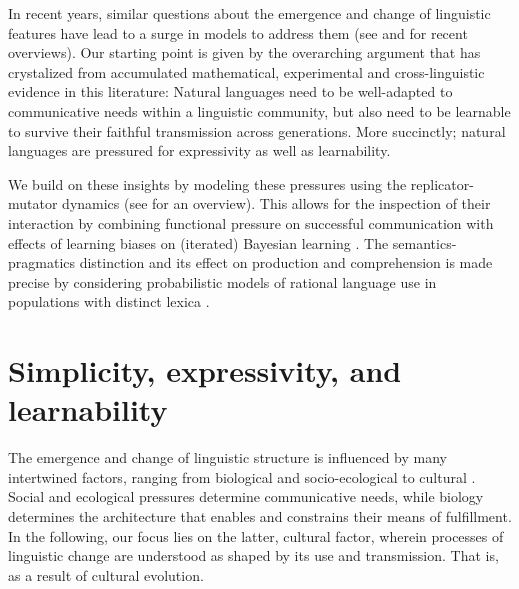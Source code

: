 \documentclass[a4paper]{article}
\begin{document}
In recent years, similar questions about the emergence and change of linguistic features have lead to a surge in models to address them (see \citealt{steels:2015} and \citealt{tamariz+kirby:2016} for recent overviews). Our starting point is given by the overarching argument that has crystalized from accumulated mathematical, experimental and cross-linguistic evidence in this literature: Natural languages need to be well-adapted to communicative needs within a linguistic community, but also need to be learnable to survive their faithful transmission across generations. More succinctly; natural languages are pressured for expressivity as well as learnability.   

We build on these insights by modeling these pressures using the replicator-mutator dynamics (see \citealt{hofbauer+sigmund:2003} for an overview). This allows for the inspection of their interaction by combining functional pressure on successful communication with effects of learning biases on (iterated) Bayesian learning \citep{griffiths+kalish:2007}. The semantics-pragmatics distinction and its effect on production and comprehension is made precise by considering probabilistic models of rational language use in populations with distinct lexica \citep{frank+goodman:2012,franke+jaeger:2014, bergen+etal:2016}. 




\section{Simplicity, expressivity, and learnability}

The emergence and change of linguistic structure is influenced by many intertwined factors, ranging from biological and socio-ecological to cultural \citep{steels:2011,tamariz+kirby:2016}. Social and ecological pressures determine communicative needs, while biology determines the architecture that enables and constrains their means of fulfillment. In the following, our focus lies on the latter, cultural factor, wherein processes of linguistic change are understood as shaped by its use and transmission. That is, as a result of cultural evolution.
\end{document}
